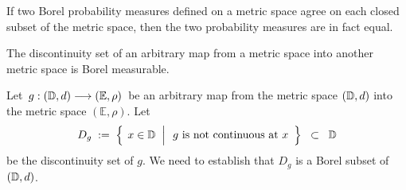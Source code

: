 
\begin{corollary}
\mbox{}\vskip 0.1cm
\noindent
If two Borel probability measures defined on a metric space agree on each closed subset of the metric space,
then the two probability measures are in fact equal.
\end{corollary}


\begin{proposition}\label{DiscontinuitySetsInMetricSpacesAreBorel}
\mbox{} \vskip 0.1cm \noindent
The discontinuity set of an arbitrary map from a metric space into another metric space is Borel measurable.
\end{proposition}
\proof
Let \,$g : (\mathbb{D},d) \longrightarrow (\mathbb{E},\rho)$\, be an arbitrary map from
the metric space $(\mathbb{D},d)$ into the metric space $(\mathbb{E},\rho)$.
Let
\begin{equation*}
D_{g}
\; := \;
	\left\{\;\left.
		x\overset{{\color{white}.}}{\in}\D
		\;\;\right\vert
		\begin{array}{c}\textnormal{$g$ is not continuous at $x$}\end{array}
		\right\}
\;\;\subset\;\; \D
\end{equation*}
be the discontinuity set of $g$.
We need to establish that $D_{g}$ is a Borel subset of $(\mathbb{D},d)$.

